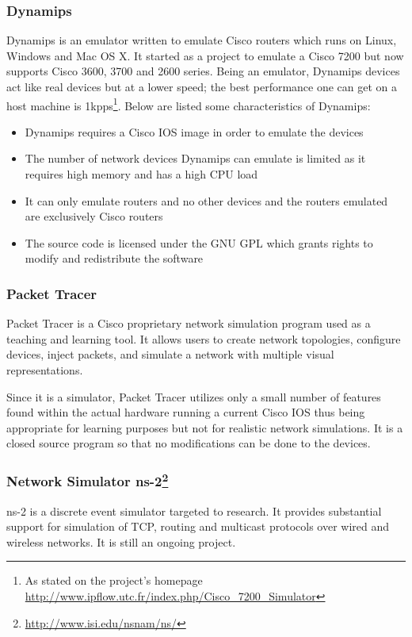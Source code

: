 \subsubsection{Dynamips}
Dynamips is an emulator written to emulate Cisco routers which runs on Linux, Windows and Mac OS X. It started as a project to emulate a Cisco 7200 but now supports  Cisco 3600, 3700 and 2600 series.
Being an emulator, Dynamips devices act like real devices but at a lower speed; the best performance one can get on a host machine is 1kpps\footnote{As stated on the project's homepage \url{http://www.ipflow.utc.fr/index.php/Cisco_7200_Simulator}}.
Below are listed some characteristics of Dynamips:
\begin{itemize}
\item Dynamips requires a Cisco IOS image in order to emulate the devices 
\item The number of network devices Dynamips can emulate is limited as it requires high memory and has a high CPU load
\item It can only emulate routers and no other devices and the routers emulated are exclusively Cisco routers
\item The source code is licensed under the GNU GPL which grants rights to modify and redistribute the software
\end{itemize}

\subsubsection{Packet Tracer}
Packet Tracer is a Cisco proprietary network simulation program used as a teaching and learning tool. 
It allows users to create network topologies, configure devices, inject packets, and simulate a network with multiple visual representations.

Since it is a simulator, Packet Tracer utilizes only a small number of features found within the actual 
hardware running a current Cisco IOS thus being appropriate for learning purposes but not for realistic network simulations.
It is a closed source program so that no modifications can be done to the devices.

\subsubsection[Network Simulator ns-2]{Network Simulator ns-2\footnote{\url{http://www.isi.edu/nsnam/ns/}}}

ns-2 is a discrete event simulator targeted to research. It provides substantial support for simulation of TCP, routing and multicast protocols over wired and wireless networks. It is still an ongoing project.
